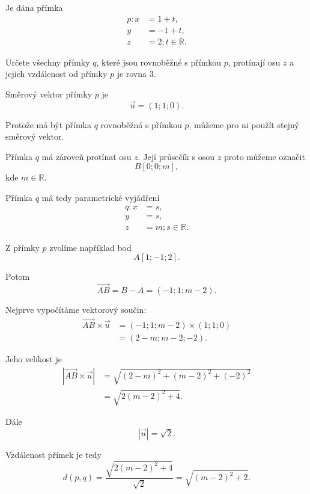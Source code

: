 \begin{example}
    \label{exa:Find_parallel_lines_given_distance_space}

    Je dána přímka
    \[
        \begin{aligned}
            p: x&=1+t,\\
            y&=-1+t,\\
            z&=2; t\in\mathbb{R}.
        \end{aligned}
    \]

    Určete všechny přímky $q$, které jsou rovnoběžné s přímkou $p$,
    protínají osu $z$ a jejich vzdálenost od přímky $p$ je rovna $3$.

    Směrový vektor přímky $p$ je
    \[
        \vec{u}=(1;1;0).
    \]

    Protože má být přímka $q$ rovnoběžná s přímkou $p$, můžeme pro ni
    použít stejný směrový vektor.

    Přímka $q$ má zároveň protínat osu $z$. Její průsečík s osou $z$
    proto můžeme označit
    \[
        B[0;0;m],
    \]
    kde $m\in\mathbb{R}$.

    Přímka $q$ má tedy parametrické vyjádření
    \[
        \begin{aligned}
            q: x&=s,\\
            y&=s,\\
            z&=m; s\in\mathbb{R}.
        \end{aligned}
    \]

    Z přímky $p$ zvolíme například bod
    \[
        A[1;-1;2].
    \]

    Potom
    \[
        \overrightarrow{AB}
        =
        B-A
        =
        (-1;1;m-2).
    \]

    Nejprve vypočítáme vektorový součin:
    \begin{align*}
        \overrightarrow{AB}\times\vec{u}
        &=
        (-1;1;m-2)\times(1;1;0)\\
        &=
        (2-m;m-2;-2).
    \end{align*}

    Jeho velikost je
    \begin{align*}
        |\overrightarrow{AB}\times\vec{u}|
        &=
        \sqrt{(2-m)^2+(m-2)^2+(-2)^2}\\
        &=
        \sqrt{2(m-2)^2+4}.
    \end{align*}

    Dále
    \[
        |\vec{u}|=\sqrt2.
    \]

    Vzdálenost přímek je tedy
    \[
        d(p,q)
        =
        \frac{\sqrt{2(m-2)^2+4}}{\sqrt2}
        =
        \sqrt{(m-2)^2+2}.
    \]


\end{example}
